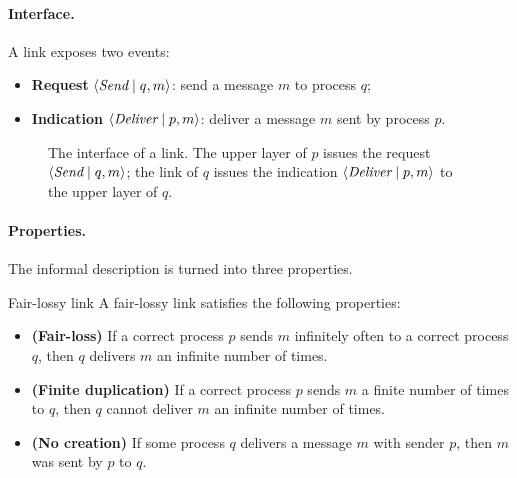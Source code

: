 \paragraph{Interface.} A link exposes two events:
\begin{itemize}
  \item \textbf{Request} $\left\langle \textit{Send} \mid q, m \right\rangle$: send a message $m$ to process $q$;
  \item \textbf{Indication} $\left\langle \textit{Deliver} \mid p, m \right\rangle$: deliver a message $m$ sent by process $p$.
\end{itemize}

\begin{figure}[H]
  \centering
  \caption{The interface of a link. The upper layer of $p$ issues the request $\left\langle \textit{Send} \mid q, m \right\rangle$; the link of $q$ issues the indication $\left\langle \textit{Deliver} \mid p, m \right\rangle$ to the upper layer of $q$.}
  \label{fig:link-interface}
\end{figure}

\paragraph{Properties.} The informal description is turned into three properties.

\begin{frameddefn}[label={def:fair-lossy}]{Fair-lossy link}
  A fair-lossy link satisfies the following properties:
  \begin{itemize}[leftmargin=3.4em]
    \item[\textbf{FL1}] \textbf{(Fair-loss)} If a correct process $p$ sends $m$ infinitely often to a correct process $q$, then $q$ delivers $m$ an infinite number of times.
    \item[\textbf{FL2}] \textbf{(Finite duplication)} If a correct process $p$ sends $m$ a finite number of times to $q$, then $q$ cannot deliver $m$ an infinite number of times.
    \item[\textbf{FL3}] \textbf{(No creation)} If some process $q$ delivers a message $m$ with sender $p$, then $m$ was sent by $p$ to $q$.
  \end{itemize}
\end{frameddefn}

